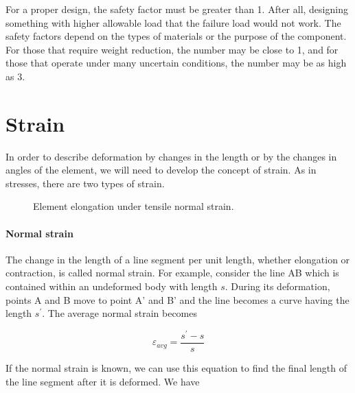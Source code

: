 \documentclass[
10pt,
a4paper,
openany,
svgnames,
]{kaobook} %
\begin{document}
For a proper design, the safety factor must be greater than 1. After all, designing something with higher allowable load that the failure load would not work. The safety factors depend on the types of materials or the purpose of the component. For those that require weight reduction, the number may be close to 1, and for those that operate under many uncertain conditions, the number may be as high as 3.

\section{Strain}

In order to describe deformation by changes in the length or by the changes in angles of the element, we will need to develop the concept of strain. As in stresses, there are two types of strain.

\begin{figure}[h]
  \centering
  \caption{Element elongation under tensile normal strain.}
\end{figure}

\paragraph{Normal strain} The change in the length of a line segment per unit length, whether elongation or contraction, is called normal strain. For example, consider the line AB which is contained within an undeformed body with length $s$. During its deformation, points A and B move to point A’ and B’ and the line becomes a curve having the length $s^\prime$. The average normal strain becomes

\begin{equation}
  \varepsilon_{avg} = \frac{s^\prime - s}{s}
\end{equation}

If the normal strain is known, we can use this equation to find the final length of the line segment after it is deformed. We have
\end{document}
